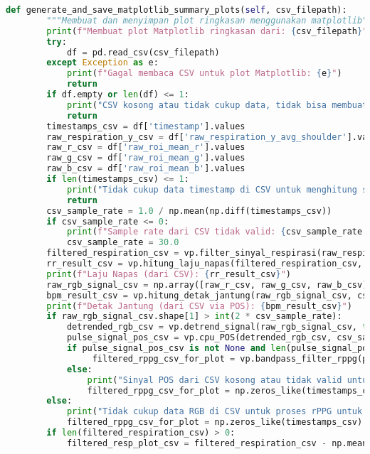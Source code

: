\documentclass[11pt,a4paper]{article}
\begin{document}
\begin{lstlisting}[language=Python, caption=Kelas RealTimeSignalWorker,label={labelkode}]
    def generate_and_save_matplotlib_summary_plots(self, csv_filepath):
        """Membuat dan menyimpan plot ringkasan menggunakan matplotlib"""
        print(f"Membuat plot Matplotlib ringkasan dari: {csv_filepath}")
        try:
            df = pd.read_csv(csv_filepath)
        except Exception as e:
            print(f"Gagal membaca CSV untuk plot Matplotlib: {e}")
            return
        if df.empty or len(df) <= 1:
            print("CSV kosong atau tidak cukup data, tidak bisa membuat plot Matplotlib ringkasan.")
            return
        timestamps_csv = df['timestamp'].values
        raw_respiration_y_csv = df['raw_respiration_y_avg_shoulder'].values 
        raw_r_csv = df['raw_roi_mean_r'].values
        raw_g_csv = df['raw_roi_mean_g'].values
        raw_b_csv = df['raw_roi_mean_b'].values
        if len(timestamps_csv) <= 1:
            print("Tidak cukup data timestamp di CSV untuk menghitung sample rate.")
            return
        csv_sample_rate = 1.0 / np.mean(np.diff(timestamps_csv))
        if csv_sample_rate <= 0: 
            print(f"Sample rate dari CSV tidak valid: {csv_sample_rate:.2f}. Menggunakan default 30Hz.")
            csv_sample_rate = 30.0 
        filtered_respiration_csv = vp.filter_sinyal_respirasi(raw_respiration_y_csv, csv_sample_rate)
        rr_result_csv = vp.hitung_laju_napas(filtered_respiration_csv, csv_sample_rate)
        print(f"Laju Napas (dari CSV): {rr_result_csv}")
        raw_rgb_signal_csv = np.array([raw_r_csv, raw_g_csv, raw_b_csv])
        bpm_result_csv = vp.hitung_detak_jantung(raw_rgb_signal_csv, csv_sample_rate)
        print(f"Detak Jantung (dari CSV via POS): {bpm_result_csv}")
        if raw_rgb_signal_csv.shape[1] > int(2 * csv_sample_rate): 
            detrended_rgb_csv = vp.detrend_signal(raw_rgb_signal_csv, type='linear')
            pulse_signal_pos_csv = vp.cpu_POS(detrended_rgb_csv, csv_sample_rate) 
            if pulse_signal_pos_csv is not None and len(pulse_signal_pos_csv) > 0:
                 filtered_rppg_csv_for_plot = vp.bandpass_filter_rppg(pulse_signal_pos_csv, csv_sample_rate)
            else:
                print("Sinyal POS dari CSV kosong atau tidak valid untuk plot Matplotlib.")
                filtered_rppg_csv_for_plot = np.zeros_like(timestamps_csv) 
        else:
            print("Tidak cukup data RGB di CSV untuk proses rPPG untuk plot Matplotlib.")
            filtered_rppg_csv_for_plot = np.zeros_like(timestamps_csv) 
        if len(filtered_respiration_csv) > 0:
            filtered_resp_plot_csv = filtered_respiration_csv - np.mean(filtered_respiration_csv)

\end{lstlisting}
\end{document}

